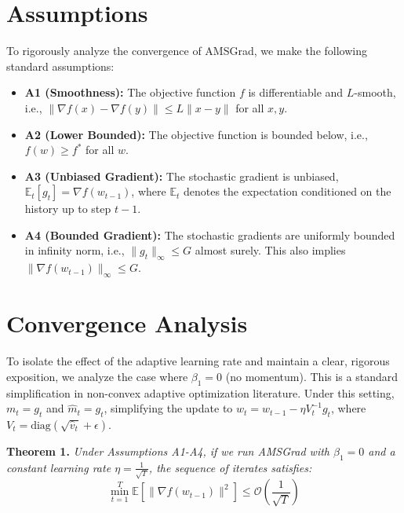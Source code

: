 \documentclass{article}
\begin{document}
\section*{Assumptions}
To rigorously analyze the convergence of AMSGrad, we make the following standard assumptions:
\begin{itemize}
    \item \textbf{A1 (Smoothness):} The objective function $f$ is differentiable and $L$-smooth, i.e., $\|\nabla f(x) - \nabla f(y)\| \le L \|x - y\|$ for all $x, y$.
    \item \textbf{A2 (Lower Bounded):} The objective function is bounded below, i.e., $f(w) \ge f^*$ for all $w$.
    \item \textbf{A3 (Unbiased Gradient):} The stochastic gradient is unbiased, $\mathbb{E}_t[g_t] = \nabla f(w_{t-1})$, where $\mathbb{E}_t$ denotes the expectation conditioned on the history up to step $t-1$.
    \item \textbf{A4 (Bounded Gradient):} The stochastic gradients are uniformly bounded in infinity norm, i.e., $\|g_t\|_\infty \le G$ almost surely. This also implies $\|\nabla f(w_{t-1})\|_\infty \le G$.
\end{itemize}

\section*{Convergence Analysis}
To isolate the effect of the adaptive learning rate and maintain a clear, rigorous exposition, we analyze the case where $\beta_1 = 0$ (no momentum). This is a standard simplification in non-convex adaptive optimization literature. Under this setting, $m_t = g_t$ and $\hat{m}_t = g_t$, simplifying the update to $w_t = w_{t-1} - \eta V_t^{-1} g_t$, where $V_t = \text{diag}(\sqrt{\hat{v}_t} + \epsilon)$.

\textbf{Theorem 1.} \textit{Under Assumptions A1-A4, if we run AMSGrad with $\beta_1 = 0$ and a constant learning rate $\eta = \frac{1}{\sqrt{T}}$, the sequence of iterates satisfies:}
\[ \min_{t=1}^T \mathbb{E}[\|\nabla f(w_{t-1})\|^2] \le \mathcal{O}\left(\frac{1}{\sqrt{T}}\right) \]
\end{document}
